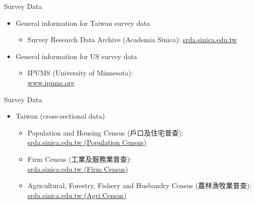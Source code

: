 \documentclass[hyperref={pdfpagelabels=false}]{beamer}
\begin{document}
\begin{frame}{Survey Data}
\begin{itemize} 
\item General information for Taiwan survey data 
\begin{itemize} 
	\vspace{0.3cm}
	\item Survey Research Data Archive (Academia Sinica): \href{https://srda.sinica.edu.tw/}{srda.sinica.edu.tw}
\end{itemize}
\item General information for US survey data 
\begin{itemize} 
	\vspace{0.3cm}
	\item IPUMS  (University of Minnesota): \\ \href{https://www.ipums.org/}{www.ipums.org}
\end{itemize}



\end{itemize}
\end{frame}







\begin{frame}{Survey Data}
\begin{itemize} 
\item Taiwan (cross-sectional data)
\begin{itemize} 
\vspace{0.3cm}
\item Population and Housing Census (戶口及住宅普查): \\ \href{https://srda.sinica.edu.tw/plan/?idx=SRDA.GS017}{srda.sinica.edu.tw (Population Census)}
\vspace{0.3cm}
\item Firm Census (工業及服務業普查): \\ \href{https://srda.sinica.edu.tw/plan/?idx=SRDA.GS024}{srda.sinica.edu.tw (Firm Census)}
\vspace{0.3cm}
\item Agricultural, Forestry, Fishery and Husbandry Census (農林漁牧業普查): \\ \href{https://srda.sinica.edu.tw/plan/?idx=SRDA.GS022}{srda.sinica.edu.tw (Agri Census)}
\vspace{0.3cm}


\end{itemize}

\end{itemize}
\end{frame}
\end{document}
